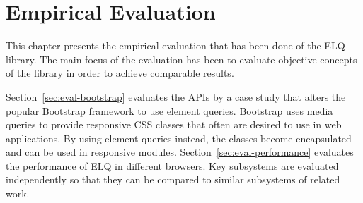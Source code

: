 \documentclass[a4paper,11pt]{kth-mag}
\begin{document}
  \chapter{Empirical Evaluation}\label{ch:eval}
    This chapter presents the empirical evaluation that has been done of the \gls{ELQ} library.
    The main focus of the evaluation has been to evaluate objective concepts of the library in order to achieve comparable results.


    Section~\ref{sec:eval-bootstrap} evaluates the \glspl{API} by a case study that alters the popular \gls{Bootstrap} framework to use element queries.
    \gls{Bootstrap} uses \gls{media queries} to provide \gls{responsive} \gls{CSS} classes that often are desired to use in \gls{web} applications.
    By using element queries instead, the classes become \gls{encapsulated} and can be used in \gls{responsive} modules.
    Section~\ref{sec:eval-performance} evaluates the performance of \gls{ELQ} in different browsers.
    Key subsystems are evaluated independently so that they can be compared to similar subsystems of related work.

\end{document}

